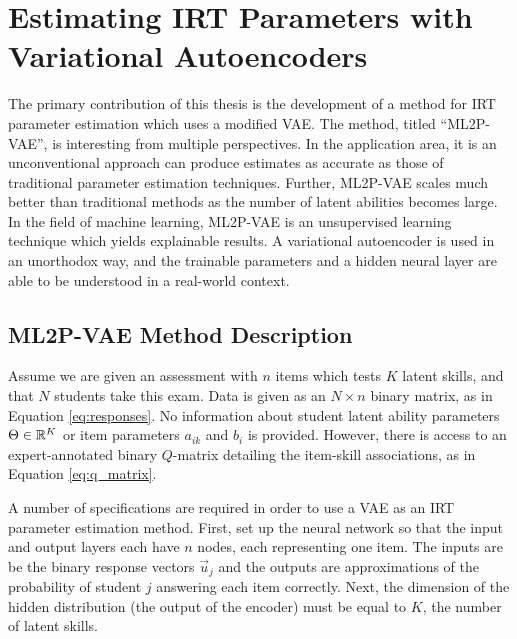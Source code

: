 \chapter{Estimating IRT Parameters with Variational Autoencoders}
The primary contribution of this thesis is the development of a method for IRT parameter estimation which uses a modified VAE. The method, titled ``ML2P-VAE'', is interesting from multiple perspectives. In the application area, it is an unconventional approach can produce estimates as accurate as those of traditional parameter estimation techniques. Further, ML2P-VAE scales much better than traditional methods as the number of latent abilities becomes large. In the field of machine learning, ML2P-VAE is an unsupervised learning technique which yields explainable results. A variational autoencoder is used in an unorthodox way, and the trainable parameters and a hidden neural layer are able to be understood in a real-world context.

\section{ML2P-VAE Method Description}
Assume we are given an assessment with $n$ items which tests $K$ latent skills, and that $N$ students take this exam. Data is given as an $N \times n$ binary matrix, as in Equation \ref{eq:responses}. No information about student latent ability parameters $\Theta \in \mathbb{R}^K$ or item parameters $a_{ik}$ and $b_i$ is provided. However, there is access to an expert-annotated binary $Q$-matrix detailing the item-skill associations, as in Equation \ref{eq:q_matrix}.

A number of specifications are required in order to use a VAE as an IRT parameter estimation method. First, set up the neural network so that the input and output layers each have $n$ nodes, each representing one item. The inputs are be the binary response vectors $\vec u_j$ and the outputs are approximations of the probability of student $j$ answering each item correctly. Next, the dimension of the hidden distribution (the output of the encoder) must be equal to $K$, the number of latent skills.

